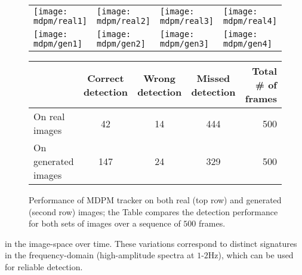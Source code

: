 \begin{figure*}
\centering
\begin{tabular}{p{4.0cm} p{4.0cm} p{4.0cm} p{4.0cm}}
   \texttt{[image: mdpm/real1]} &
   \texttt{[image: mdpm/real2]} &
   \texttt{[image: mdpm/real3]} &
   \texttt{[image: mdpm/real4]} \\
   \texttt{[image: mdpm/gen1]} &
   \texttt{[image: mdpm/gen2]} &
   \texttt{[image: mdpm/gen3]} &
   \texttt{[image: mdpm/gen4]} \\
\end{tabular}
\label{fig:mdpm}
\vspace{4mm}

\begin{tabular}{l|c|c|c|r|}
 \cline{2-5}
 &  Correct detection & Wrong detection & Missed detection & Total \# of frames\\ \hline  \cline{2-4}
On real images  &  42 & 14 & 444 & 500  \\ \hline
On generated images  &  147 & 24 & 329 & 500  \\ \hline
\end{tabular}

\caption{Performance of MDPM tracker \cite{islam2017mixed} on both real (top row) and generated (second row) images; the Table 
compares the detection performance for both sets of images over a sequence of $500$ frames.   }
\label{mdpmStuff}
\end{figure*}


in the image-space over time. These variations correspond to distinct signatures in the frequency-domain (high-amplitude spectra 
at $1$-$2$Hz), which can be used for reliable detection.
